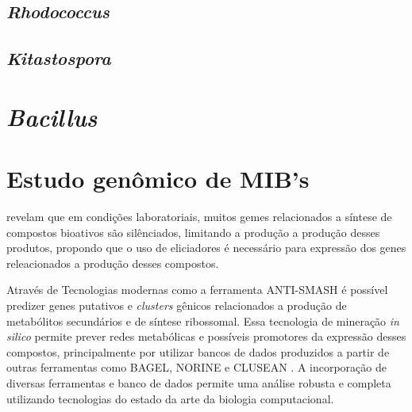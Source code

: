 \subsection{\textit{Rhodococcus}}
\subsection{\textit{Kitastospora}}
\section{\textit{Bacillus}}

\section{Estudo genômico de MIB's}

 revelam que em condições laboratoriais, muitos gemes relacionados a síntese de
compostos bioativos são silênciados, limitando a produção a produção desses produtos, propondo
que o uso de eliciadores é necessário para expressão dos genes releacionados a produção desses 
compostos.

Através de Tecnologias modernas como a ferramenta ANTI-SMASH \cite{antismash} é possível predizer
genes putativos e \textit{clusters} gênicos relacionados a produção de metabólitos secundários
e de síntese ribossomal. Essa tecnologia de mineração \textit{in silico} permite prever redes
metabólicas e possíveis promotores da expressão desses compostos, principalmente por utilizar
bancos de dados produzidos a partir de outras ferramentas como BAGEL, NORINE e CLUSEAN \cite{bagel2,bagel3,norine,clusean}.
A incorporação de diversas ferramentas e banco de dados permite uma análise robusta 
e completa utilizando tecnologias do estado da arte da biologia computacional.

